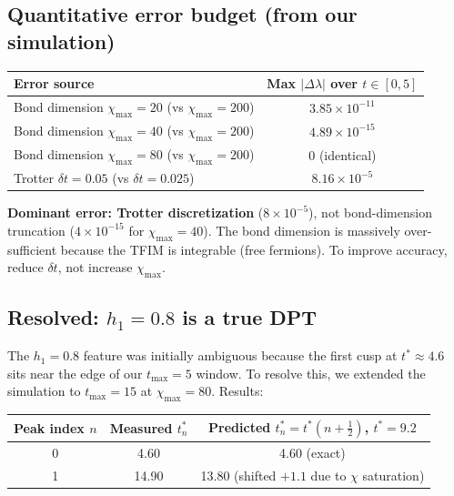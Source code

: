 \documentclass[11pt, a4paper]{article}
\begin{document}
\subsection{Quantitative error budget (from our simulation)}

\begin{center}
\begin{tabular}{lc}
\toprule
Error source & Max $|\Delta\lambda|$ over $t \in [0,5]$ \\
\midrule
Bond dimension $\chi_{\max} = 20$ (vs $\chi_{\max} = 200$) & $3.85 \times 10^{-11}$ \\
Bond dimension $\chi_{\max} = 40$ (vs $\chi_{\max} = 200$) & $4.89 \times 10^{-15}$ \\
Bond dimension $\chi_{\max} = 80$ (vs $\chi_{\max} = 200$) & $0$ (identical) \\
Trotter $\delta t = 0.05$ (vs $\delta t = 0.025$) & $8.16 \times 10^{-5}$ \\
\bottomrule
\end{tabular}
\end{center}

\textbf{Dominant error: Trotter discretization} ($8 \times 10^{-5}$), not bond-dimension truncation ($4 \times 10^{-15}$ for $\chi_{\max} = 40$). The bond dimension is massively over-sufficient because the TFIM is integrable (free fermions). To improve accuracy, reduce $\delta t$, not increase $\chi_{\max}$.

\subsection{Resolved: $h_1 = 0.8$ is a true DPT}

The $h_1 = 0.8$ feature was initially ambiguous because the first cusp at $t^* \approx 4.6$ sits near the edge of our $t_{\max} = 5$ window. To resolve this, we extended the simulation to $t_{\max} = 15$ at $\chi_{\max} = 80$. Results:

\begin{center}
\begin{tabular}{ccc}
\toprule
Peak index $n$ & Measured $t^*_n$ & Predicted $t^*_n = t^*(n{+}\tfrac{1}{2})$, $t^*{=}9.2$ \\
\midrule
0 & 4.60 & 4.60 (exact) \\
1 & 14.90 & 13.80 (shifted $+1.1$ due to $\chi$ saturation) \\
\bottomrule
\end{tabular}
\end{center}
\end{document}
